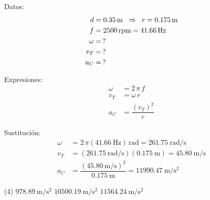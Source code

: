 \documentclass[12pt, letter]{exam}
\begin{document}
\begin{questions}
    \begin{minipage}[t]{0.4\linewidth}
    Datos: 
    \begin{align*}
    d &= \SI{0.35}{\meter} \hspace{0.2cm} \Rightarrow \hspace{0.2cm} r = \SI{0.175}{\meter} \\
    f &= 2500 \, \text{rpm} = \SI{41.66}{\hertz} \\
    \omega &= \, ? \\
    v_{T} &= \, ? \\
    a_{C} &= \, ?
    \end{align*}
    \end{minipage}
    \hspace{1cm}
    \begin{minipage}[t]{0.4\linewidth}
    Expresiones:
    \begin{align*}
    \omega &= 2 \, \pi \, f \\
    v_{T} &= \omega \, r \\
    a_{C} &= \dfrac{\left( v_{T} \right)^{2}}{r}
    \end{align*}
    \end{minipage}

    Sustitución:
    \begin{align*}
    \omega &= 2 \, \pi (\SI{41.66}{\hertz}) \, \unit{\radian} = \SI[per-mode=fraction]{261.75}{\radian\per\second} \\[0.5em]
    v_{T} &= \left( \SI[per-mode=fraction]{261.75}{\radian\per\second} \right) \left( \SI{0.175}{\meter} \right) = \SI[per-mode=fraction]{45.80}{\meter\per\second} \\[0.5em]
    a_{C} &= \dfrac{\left( \displaystyle \SI[per-mode=fraction]{45.80}{\meter\per\second} \right)^{2}}{\SI{0.175}{\meter}} = \SI[per-mode=fraction]{11990.47}{\meter\per\square\second}
    \end{align*}

    \vspace{0.3cm}
    \begin{tasks}(4)
        \task $\displaystyle \SI[per-mode=fraction]{978.89}{\meter\per\square\second}$
        \task $\displaystyle \SI[per-mode=fraction]{10500.19}{\meter\per\square\second}$
        \task $\displaystyle \SI[per-mode=fraction]{11564.24}{\meter\per\square\second}$
        \task {}
    \end{tasks}

\end{questions}
\end{document}
